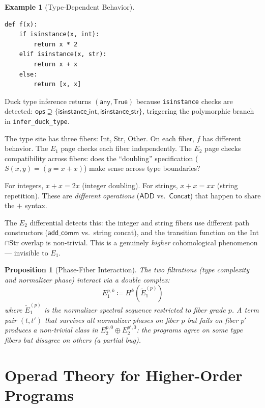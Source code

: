 \documentclass[11pt,a4paper]{report}
\theoremstyle{definition}
\newtheorem{example}[definition]{Example}
\theoremstyle{plain}
\newtheorem{proposition}[definition]{Proposition}
\begin{document}
\begin{example}[Type-Dependent Behavior]
\begin{lstlisting}
def f(x):
    if isinstance(x, int):
        return x * 2
    elif isinstance(x, str):
        return x + x
    else:
        return [x, x]
\end{lstlisting}

Duck type inference returns $(\mathsf{any}, \mathsf{True})$ because
\texttt{isinstance} checks are detected:
$\mathsf{ops} \supseteq \{\mathsf{isinstance\_int},
\mathsf{isinstance\_str}\}$, triggering the polymorphic branch in
\texttt{infer\_duck\_type}.

The type site has three fibers: Int, Str, Other.  On each fiber,
$f$ has different behavior.  The $E_1$ page checks each fiber
independently.  The $E_2$ page checks compatibility across fibers:
does the ``doubling'' specification ($S(x, y) = (y = x + x)$)
make sense across type boundaries?

For integers, $x + x = 2x$ (integer doubling).
For strings, $x + x = xx$ (string repetition).
These are \emph{different operations} ($\mathsf{ADD}$ vs.\
$\mathsf{Concat}$) that happen to share the $+$ syntax.

The $E_2$ differential detects this: the integer and string fibers
use different path constructors ($\mathsf{add\_comm}$ vs.\ string
concat), and the transition function on the Int$\cap$Str overlap
is non-trivial.  This is a genuinely \emph{higher} cohomological
phenomenon --- invisible to $E_1$.
\end{example}

\begin{proposition}[Phase-Fiber Interaction]
\label{prop:phase-fiber}
The two filtrations (type complexity and normalizer phase) interact
via a \emph{double complex}:
\[
  E_1^{p,k} \coloneqq H^k(\widetilde{E}_1^{(p)})
\]
where $\widetilde{E}_1^{(p)}$ is the normalizer spectral sequence
restricted to fiber grade $p$.  A term pair $(t, t')$ that survives
all normalizer phases on fiber $p$ but fails on fiber $p'$ produces
a non-trivial class in $E_2^{p,0} \oplus E_2^{p',0}$: the programs
agree on some type fibers but disagree on others (a partial bug).
\end{proposition}


\chapter{Operad Theory for Higher-Order Programs}
\label{ch:operads}
\end{document}
